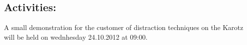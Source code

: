\subsection*{Activities:}
A small demonstration for the customer of distraction techniques on the Karotz will be held on wednhesday 24.10.2012 at 09:00.                                                                                                                                                                                                                                                                                                                                                                                                                    